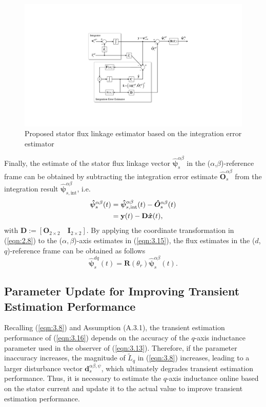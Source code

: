 \begin{figure}[t]
    \centering
    \includegraphics[scale=0.8]{chapters/Fig3.2.pdf}
    \caption{Proposed stator flux linkage estimator based on the integration error estimator}
    \label{Fig:3.2}
\end{figure}

Finally, the estimate of the stator flux linkage vector \( \boldsymbol{\hat{\psi}}^{\alpha\beta}_s \) in the (\(\alpha\),\(\beta\))-reference frame can be obtained by subtracting the integration error estimate \( \boldsymbol{\hat{O}}^{\alpha\beta}_s \) from the integration result \( \boldsymbol{\hat{\psi}}^{\alpha\beta}_{s,\text{int}} \), i.e.
\begin{align}\notag
\boldsymbol{\hat{\psi}}^{\alpha\beta}_s(t) &= \boldsymbol{\hat{\psi}}^{\alpha\beta}_{s,\text{int}}(t) - \boldsymbol{\hat{O}}^{\alpha\beta}_s(t) \\\label{eqn:3.15}
&= \mathbf{y}(t) - \mathbf{D} \boldsymbol{\hat{x}}(t),
\end{align}
with $\mathbf{D} := [\mathbf{O}_{2\times2} \quad \mathbf{I}_{2\times2} ]$. By applying the coordinate transformation in (\ref{eqn:2.8}) to the (\(\alpha,\beta\))-axis estimates in (\ref{eqn:3.15}), the flux estimates in the ($d$,$q$)-reference frame can be obtained as follows
\begin{equation}\label{eqn:3.16}
\boldsymbol{\hat{\psi}}^{dq}_s(t) = \mathbf{R}(\theta_r) \boldsymbol{\hat{\psi}}^{\alpha\beta}_s(t).
\end{equation}

\subsection{Parameter Update for Improving Transient Estimation Performance}
Recalling (\ref{eqn:3.8}) and Assumption (A.3.1), the transient estimation performance of (\ref{eqn:3.16}) depends on the accuracy of the $q$-axis inductance parameter used in the observer of (\ref{eqn:3.13}). Therefore, if the parameter inaccuracy increases, the magnitude of \(\tilde{L}_q\) in (\ref{eqn:3.8}) increases, leading to a larger disturbance vector \(\mathbf{d}^{\alpha\beta,\psi}_s\), which ultimately degrades transient estimation performance. Thus, it is necessary to estimate the $q$-axis inductance online based on the stator current and update it to the actual value to improve transient estimation performance. 

